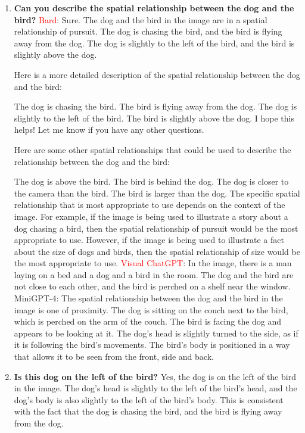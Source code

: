     \begin{enumerate}
        \item \textbf{Can you describe the spatial relationship between the dog and the bird?}
        \subitem \textcolor{Red}{Bard}: 
        Sure. The dog and the bird in the image are in a spatial relationship of pursuit. The dog is chasing the bird, and the bird is flying away from the dog. The dog is slightly to the left of the bird, and the bird is slightly above the dog.

        Here is a more detailed description of the spatial relationship between the dog and the bird:

        The dog is chasing the bird.
        The bird is flying away from the dog.
        The dog is slightly to the left of the bird.
        The bird is slightly above the dog.
        I hope this helps! Let me know if you have any other questions.

        Here are some other spatial relationships that could be used to describe the relationship between the dog and the bird:

        The dog is above the bird.
        The bird is behind the dog.
        The dog is closer to the camera than the bird.
        The bird is larger than the dog.
        The specific spatial relationship that is most appropriate to use depends on the context of the image. For example, if the image is being used to illustrate a story about a dog chasing a bird, then the spatial relationship of pursuit would be the most appropriate to use. However, if the image is being used to illustrate a fact about the size of dogs and birds, then the spatial relationship of size would be the most appropriate to use.
        \subitem \textcolor{red}{Visual ChatGPT}: In the image, there is a man laying on a bed and a dog and a bird in the room. The dog and the bird are not close to each other, and the bird is perched on a shelf near the window.
        \subitem MiniGPT-4: The spatial relationship between the dog and the bird in the image is one of proximity. The dog is sitting on the couch next to the bird, which is perched on the arm of the couch. The bird is facing the dog and appears to be looking at it. The dog’s head is slightly turned to the side, as if it is following the bird’s movements. The bird’s body is positioned in a way that allows it to be seen from the front, side and back.
        \item \textbf{Is this dog on the left of the bird?}
        \subitem Yes, the dog is on the left of the bird in the image. The dog's head is slightly to the left of the bird's head, and the dog's body is also slightly to the left of the bird's body. This is consistent with the fact that the dog is chasing the bird, and the bird is flying away from the dog.


\end{enumerate}
